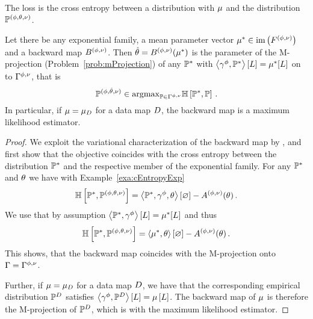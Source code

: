 The loss is the cross entropy between a distribution with $\mu$ and the distribution $\mathbb{P}^{(\phi,\theta,\nu)}$.


\begin{theorem}
	Let there be any exponential family, a mean parameter vector $\mu^*\in\mathrm{im}\left(F^{(\phi,\nu)}\right)$ and a backward map $B^{(\phi,\nu)}$.
	Then $\hat{\theta}=B^{(\phi,\nu)}(\mu^*)$ is the parameter of the M-projection (Problem~\ref{prob:mProjection}) of any $\mathbb{P}^*$ with $\left\langle \gamma^{\phi},\mathbb{P}^*\right\rangle \left[ L \right]=\mu^*[L]$ on to $\Gamma^{\phi,\nu}$, that is
		\[ \mathbb{P}^{(\phi,\hat{\theta},\nu)} \in \mathrm{argmax}_{\mathbb{P}\in\Gamma^{\phi,\nu}} \mathbb{H}\left[\mathbb{P}^*,\mathbb{P}\right]  \, . \]
	In particular, if $\mu=\mu_{D}$ for a data map $D$, the backward map is a maximum likelihood estimator.
\end{theorem}
\begin{proof}
	We exploit the variational characterization of the backward map by , and first show that the objective coincides with the cross entropy between the distribution $\mathbb{P}^*$ and the respective member of the exponential family.
	For any $\mathbb{P}^*$ and $\theta$ we have with Example~\ref{exa:cEntropyExp}
	\begin{align*}
		\mathbb{H}\left[\mathbb{P}^*,\mathbb{P}^{(\phi,\theta,\nu)}\right] 
		=   \left\langle \mathbb{P}^*,\gamma^{\phi},\theta\right\rangle \left[ \varnothing \right] -A^{(\phi,\nu)}(\theta) \, .  
	\end{align*}
	We use that by assumption $\left\langle \mathbb{P}^*,\gamma^{\phi}\right\rangle \left[ L \right]=\mu^*[L]$ and thus
	\begin{align*}
		\mathbb{H}\left[\mathbb{P}^*,\mathbb{P}^{(\phi,\theta,\nu)}\right] 
		=   \left\langle \mu^*,\theta\right\rangle \left[ \varnothing \right] -A^{(\phi,\nu)}(\theta) \, .  
	\end{align*}
	This shows, that the backward map coincides with the M-projection onto $\Gamma=\Gamma^{\phi,\nu}$.

	Further, if $\mu=\mu_{D}$ for a data map $D$, we have that the corresponding empirical distribution $\mathbb{P}^{D}$ satisfies $\left\langle \gamma^{\phi},\mathbb{P}^{D}\right\rangle \left[ L \right]=\mu\left[L\right]$.
	The backward map of $\mu$ is therefore the M-projection of $\mathbb{P}^{D}$, which is with  the maximum likelihood estimator.
\end{proof}


